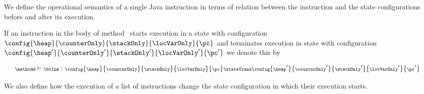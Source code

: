  


 We define the operational semantics of a single Java instruction in terms of
 relation between the instruction and the state configurations
 before and after its execution.

 \begin{StateTransition} \label{stateTrans} 
 If an instruction \bcIns in the body of method \methodd \ starts execution in a state with configuration  
 $\config{ \heap}{\counterOnly}{\stackOnly}{\locVarOnly}{ \pc}$ and
  terminates execution in state with configuration  $\config{ \heap'}{\counterOnly'}{\stackOnly'}{\locVarOnly'}{\pc'}$ we denote this by

  $$  {\scriptsize \methodd \vdash \bcIns : \config{ \heap}{\counterOnly}{\stackOnly}{\locVarOnly}{ \pc }   \stateTrans \config{ \heap'}{\counterOnly'}{\stackOnly'}{\locVarOnly'}{\pc'} } $$
 \end{StateTransition}

 We also define how the execution of a list of instructions change the state configuration in  which their execution starts.
 

